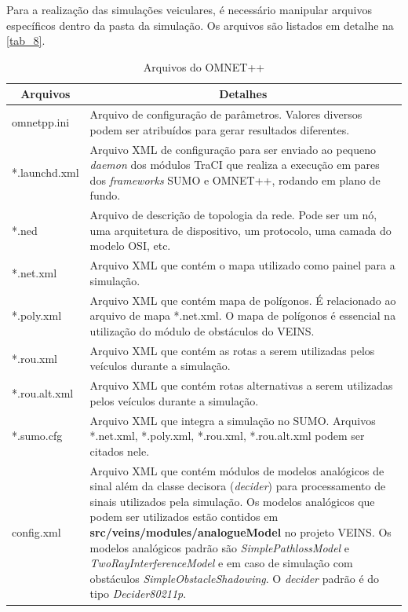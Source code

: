 \documentclass[
12pt,				%
openright,			%
oneside,			%
a4paper,			%
brazil,				%
]{abntex2}
\begin{document}
	\newpage
	
	\par Para a realização das simulações veiculares, é necessário manipular arquivos específicos dentro da pasta da simulação. Os arquivos são listados em detalhe na \autoref{tab_8}.
		
	\begin{table}[H]
		\centering
		\renewcommand{\arraystretch}{1.5}
		\begin{tabular}{|l|p{12.5cm}|}
			\hline
			\multicolumn{1}{|c|}{\textbf{Arquivos}} & \multicolumn{1}{c|}{\textbf{Detalhes}} \\ \hline
			omnetpp.ini & Arquivo de configuração de parâmetros. Valores diversos podem ser atribuídos para gerar resultados diferentes. \\ \hline
			*.launchd.xml & Arquivo XML de configuração para ser enviado ao pequeno \textit{daemon} dos módulos TraCI que realiza a execução em pares dos \textit{frameworks} SUMO e OMNET++, rodando em plano de fundo. \\ \hline
			*.ned & Arquivo de descrição de topologia da rede. Pode ser um nó, uma arquitetura de dispositivo, um protocolo, uma camada do modelo OSI, etc. \\ \hline
			*.net.xml & Arquivo XML que contém o mapa utilizado como painel para a simulação. \\ \hline
			*.poly.xml & Arquivo XML que contém mapa de polígonos. É relacionado ao arquivo de mapa *.net.xml. O mapa de polígonos é essencial na utilização do módulo de obstáculos do VEINS. \\ \hline
			*.rou.xml & Arquivo XML que contém as rotas a serem utilizadas pelos veículos durante a simulação. \\ \hline
			*.rou.alt.xml & Arquivo XML que contém rotas alternativas a serem utilizadas pelos veículos durante a simulação. \\ \hline
			*.sumo.cfg & Arquivo XML que integra a simulação no SUMO. Arquivos *.net.xml, *.poly.xml, *.rou.xml, *.rou.alt.xml podem ser citados nele. \\ \hline
			config.xml & Arquivo XML que contém módulos de modelos analógicos de sinal além da classe decisora (\textit{decider}) para processamento de sinais utilizados pela simulação. Os modelos analógicos que podem ser utilizados estão contidos em \textbf{src/veins/modules/analogueModel} no projeto VEINS. Os modelos analógicos padrão são \textit{SimplePathlossModel} e \textit{TwoRayInterferenceModel} e em caso de simulação com obstáculos \textit{SimpleObstacleShadowing}. O \textit{decider} padrão é do tipo \textit{Decider80211p}. \\
			\hline
		\end{tabular}
			\caption{Arquivos do OMNET++}
			\label{tab_8}
	\end{table}
	
\end{document}
